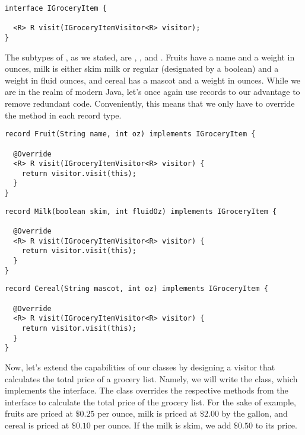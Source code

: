 \begin{cl}[]{}
\begin{lstlisting}[language=MyJava]
interface IGroceryItem {

  <R> R visit(IGroceryItemVisitor<R> visitor);
}
\end{lstlisting}
\end{cl}

The subtypes of , as we stated, are , , and . Fruits have a name and a weight in ounces, milk is either skim milk or regular (designated by a boolean) and a weight in fluid ounces, and cereal has a mascot and a weight in ounces. While we are in the realm of modern Java, let's once again use records to our advantage to remove redundant code. Conveniently, this means that we only have to override the  method in each record type.

\begin{cl}[]{}
\begin{lstlisting}[language=MyJava]
record Fruit(String name, int oz) implements IGroceryItem {

  @Override
  <R> R visit(IGroceryItemVisitor<R> visitor) { 
    return visitor.visit(this); 
  }
}
\end{lstlisting}
\end{cl}

\begin{cl}[]{}
\begin{lstlisting}[language=MyJava]
record Milk(boolean skim, int fluidOz) implements IGroceryItem {
  
  @Override
  <R> R visit(IGroceryItemVisitor<R> visitor) {
    return visitor.visit(this); 
  }
}
\end{lstlisting}
\end{cl}

\begin{cl}[]{}
\begin{lstlisting}[language=MyJava]
record Cereal(String mascot, int oz) implements IGroceryItem {
    
  @Override
  <R> R visit(IGroceryItemVisitor<R> visitor) {
    return visitor.visit(this); 
  }
}
\end{lstlisting}
\end{cl}

Now, let's extend the capabilities of our classes by designing a visitor that calculates the total price of a grocery list. Namely, we will write the  class, which implements the  interface. The  class overrides the respective methods from the  interface to calculate the total price of the grocery list. For the sake of example, fruits are priced at $\$0.25$ per ounce, milk is priced at $\$2.00$ by the gallon, and cereal is priced at $\$0.10$ per ounce. If the milk is skim, we add $\$0.50$ to its price.

